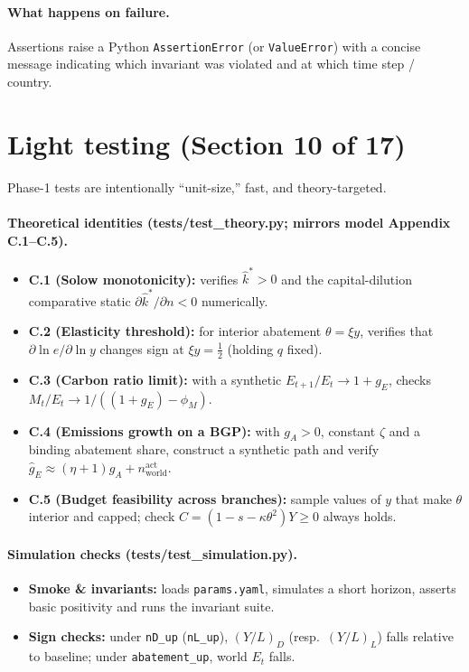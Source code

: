 \documentclass[12pt,a4paper]{article}
\newcommand{\code}[1]{\texttt{#1}}
\begin{document}
\paragraph{What happens on failure.} Assertions raise a Python \code{AssertionError} (or \code{ValueError}) with a concise message indicating which invariant was violated and at which time step / country.



\section{Light testing (Section 10 of 17)}
Phase-1 tests are intentionally “unit-size,” fast, and theory-targeted.

\paragraph{Theoretical identities (tests/test\_theory.py; mirrors model Appendix C.1--C.5).}
\begin{itemize}[leftmargin=1.25em]
\item \textbf{C.1 (Solow monotonicity):} verifies $\hat{k}^\ast>0$ and the capital-dilution comparative static $\partial \hat{k}^\ast/\partial n<0$ numerically.
  \item \textbf{C.2 (Elasticity threshold):} for interior abatement $\theta=\xi y$, verifies that $\partial\ln e/\partial\ln y$ changes sign at \(\xi y=\tfrac12\) (holding \(q\) fixed).
  \item \textbf{C.3 (Carbon ratio limit):} with a synthetic $E_{t+1}/E_t\to 1+g_E$, checks $M_t/E_t\to 1/((1+g_E)-\phi_M)$.
  \item \textbf{C.4 (Emissions growth on a BGP):} with \(g_A>0\), constant \(\zeta\) and a binding abatement share, construct a synthetic path and verify \(\hat g_{E}\approx (\eta+1)g_A+n^{\text{act}}_{\text{world}}\).
\item \textbf{C.5 (Budget feasibility across branches):} sample values of \(y\) that make \(\theta\) interior and capped; check \(C=(1-s-\kappa\theta^2)Y\ge 0\) always holds.
\end{itemize}

\paragraph{Simulation checks (tests/test\_simulation.py).}
\begin{itemize}[leftmargin=1.25em]
  \item \textbf{Smoke \& invariants:} loads \code{params.yaml}, simulates a short horizon, asserts basic positivity and runs the invariant suite.
  \item \textbf{Sign checks:} under \code{nD\_up} (\code{nL\_up}), $(Y/L)_D$ (resp.\ $(Y/L)_L$) falls relative to baseline; under \code{abatement\_up}, world $E_t$ falls.
\end{itemize}
\end{document}
